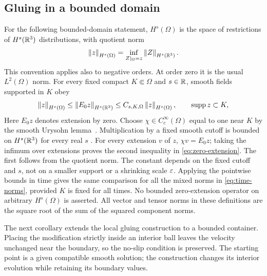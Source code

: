 \subsection{Gluing in a bounded domain}
For the following bounded-domain statement, $H^s(\Omega)$ is the space
of restrictions of $H^s(\mathbb R^3)$ distributions, with quotient norm
\begin{equation}\label{eq:restriction-norm}
 \left\lVert z\right\rVert_{H^s(\Omega)}=\inf_{Z|_\Omega=z}\left\lVert Z\right\rVert_{H^s(\mathbb R^3)}.
\end{equation}
This convention applies also to negative orders. At order zero it is the
usual $L^2(\Omega)$ norm.
For every fixed compact $K\Subset\Omega$ and $s\in\mathbb R$, smooth fields supported
in $K$ obey
\begin{equation}\label{eq:zero-extension}
 \left\lVert z\right\rVert_{H^s(\Omega)}\le\left\lVert E_0z\right\rVert_{H^s(\mathbb R^3)}
 \le C_{s,K,\Omega}\left\lVert z\right\rVert_{H^s(\Omega)},
 \qquad \operatorname{supp}z\subset K,
\end{equation}
Here $E_0z$ denotes extension by zero. Choose $\chi\in C_c^\infty(\Omega)$ equal to one near $K$ by the
smooth Urysohn lemma~\cite{petersen}. Multiplication by a fixed smooth cutoff
is bounded on $H^s(\mathbb R^3)$ for every real $s$
\cite[Chapter~4, Section~2, (2.19)]{taylor2011}. For every extension $v$ of $z$,
$\chi v=E_0z$; taking the infimum over extensions proves the second
inequality in \eqref{eq:zero-extension}. The first follows from the quotient norm.
The constant depends on the fixed cutoff and $s$, not on a smaller support
or a shrinking scale $\varepsilon$. Applying the pointwise bounds in time gives the
same comparison for all the mixed norms in \eqref{eq:time-norms}, provided
$K$ is fixed for all times. No bounded zero-extension operator on arbitrary
$H^s(\Omega)$ is asserted. All vector and tensor norms in these definitions
are the square root of the sum of the squared component norms.

The next corollary extends the local gluing construction to a bounded
container. Placing the modification strictly inside an interior ball leaves
the velocity unchanged near the boundary, so the no-slip condition is
preserved. The starting point is a given compatible smooth solution; the
construction changes its interior evolution while retaining its boundary values.

